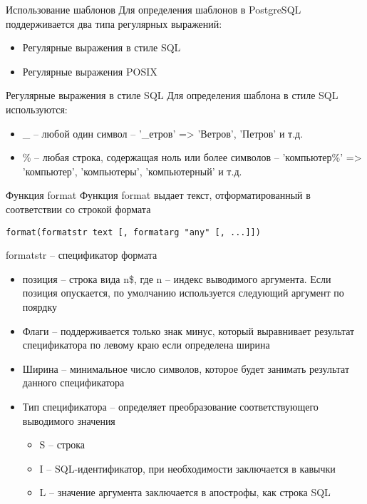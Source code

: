 \documentclass[12pt]{article}
\begin{document}
\begin{nota}{Использование шаблонов}
    Для определения шаблонов в PostgreSQL поддерживается два типа регулярных выражений:

    \begin{itemize}
        \item Регулярные выражения в стиле SQL 
        \item Регулярные выражения POSIX
    \end{itemize}
\end{nota}

\begin{nota}{Регулярные выражения в стиле SQL}
    Для определения шаблона в стиле SQL используются:

    \begin{itemize}
        \item \_ -- любой один символ -- '\_етров' => 'Ветров', 'Петров' и т.д.
        \item \% -- любая строка, содержащая ноль или более символов -- 'компьютер\%' => 'компьютер', 'компьютеры', 'компьютерный' и т.д.
    \end{itemize}
\end{nota}

\begin{defin}{Функция format}
    Функция format выдает текст, отформатированный в соответствии со строкой формата 

\begin{lstlisting}
format(formatstr text [, formatarg "any" [, ...]])
\end{lstlisting}

    formatstr -- спецификатор формата 

    \begin{itemize}
        \item позиция -- строка вида n\$, где n -- индекс выводимого аргумента. Если позиция опускается, по умолчанию используется следующий аргумент по поярдку
        \item Флаги -- поддерживается только знак минус, который выравнивает результат спецификатора по левому краю если определена ширина
        \item Ширина -- минимальное число символов, которое будет занимать результат данного спецификатора
        \item Тип спецификатора -- определяет преобразование соответствующего выводимого значения
        
        \begin{itemize}
            \item S -- строка
            \item I -- SQL-идентификатор, при необходимости заключается в кавычки 
            \item L -- значение аргумента заключается в апострофы, как строка SQL
        \end{itemize}
    \end{itemize}
\end{defin}
\end{document}
